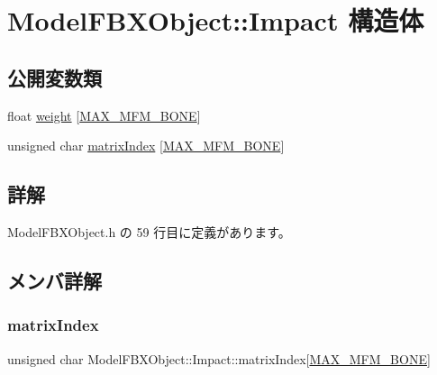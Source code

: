\hypertarget{struct_model_f_b_x_object_1_1_impact}{}\section{Model\+F\+B\+X\+Object\+:\+:Impact 構造体}
\label{struct_model_f_b_x_object_1_1_impact}
\subsection*{公開変数類}
\begin{DoxyCompactItemize}
\item 
float \mbox{\hyperlink{struct_model_f_b_x_object_1_1_impact_a863397edc05dc95c5a39e77947f2453a}{weight}} \mbox{[}\mbox{\hyperlink{_model_f_b_x_object_8h_a73b1fbbe9f60c4c5bfbc131d9672213a}{M\+A\+X\+\_\+\+M\+F\+M\+\_\+\+B\+O\+NE}}\mbox{]}
\item 
unsigned char \mbox{\hyperlink{struct_model_f_b_x_object_1_1_impact_aa5e14146b883ce78fffde810221371db}{matrix\+Index}} \mbox{[}\mbox{\hyperlink{_model_f_b_x_object_8h_a73b1fbbe9f60c4c5bfbc131d9672213a}{M\+A\+X\+\_\+\+M\+F\+M\+\_\+\+B\+O\+NE}}\mbox{]}
\end{DoxyCompactItemize}


\subsection{詳解}


 Model\+F\+B\+X\+Object.\+h の 59 行目に定義があります。



\subsection{メンバ詳解}
\mbox{\label{struct_model_f_b_x_object_1_1_impact_aa5e14146b883ce78fffde810221371db}} 
\subsubsection{\texorpdfstring{matrix\+Index}{matrixIndex}}
{\footnotesize\ttfamily unsigned char Model\+F\+B\+X\+Object\+::\+Impact\+::matrix\+Index\mbox{[}\mbox{\hyperlink{_model_f_b_x_object_8h_a73b1fbbe9f60c4c5bfbc131d9672213a}{M\+A\+X\+\_\+\+M\+F\+M\+\_\+\+B\+O\+NE}}\mbox{]}}



